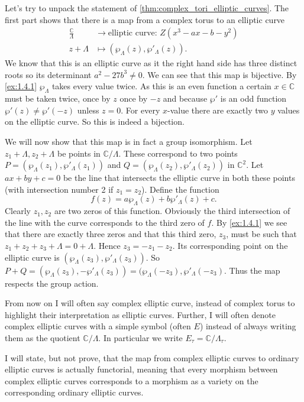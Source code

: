 \documentclass[titlepage,a4paper]{article}
\theoremstyle{theoremdd}
\theoremstyle{definitiondd}
\theoremstyle{remarkdd}
\newcommand{\C}{\mathbb{C}}
\begin{document}
Let's try to unpack the statement of \cref{thm:complex_tori_elliptic_curves}.
The first part shows that there is a map from a complex torus to an elliptic curve 
\begin{align*}
	\frac{\C}{\Lambda} &\longrightarrow \text{elliptic curve: } Z(x^3 - a x - b -y ^2) \\
	z+\Lambda &\longmapsto \left(\wp_\Lambda(z), \wp'_\Lambda(z)\right)
.\end{align*}
We know that this is an elliptic curve as it the right hand side has three distinct roots so its determinant $a^2 - 27 b^3 \ne 0  $.
We can see that this map is bijective. By \cref{ex:1.4.1}  $\wp_\Lambda$  takes every value twice. As this is an even function a certain $x \in \C$ must be taken twice, once by $z$ once by $-z$ and because $\wp'$ is an odd function $\wp'(z) \ne \wp'(-z)$ unless $z = 0$.  For every $x$-value there are exactly two $y$ values on the elliptic curve. So this is indeed a bijection. 

We will now show that this map is in fact a group isomorphism.
Let $z_1 + \Lambda, z_2 + \Lambda$ be points in $\C / \Lambda$.
These correspond to two points $P = (\wp_{\Lambda}(z_1), \wp'_\Lambda(z_1))$ and $ Q = (\wp_{\Lambda}(z_2), \wp'_\Lambda(z_2))$ in $\C^2$. 
Let $ax + by + c = 0$ be the line that intersects the elliptic curve in both these points (with intersection number 2 if  $z_1 = z_2$).
Define the function \[
	f(z) = a \wp_{\Lambda}(z) + b \wp'_\Lambda(z) + c
.\] 
Clearly $z_1, z_2$ are two zeros of this function. Obviously the third intersection of the line with the curve corresponds to the third zero of $f$. 
By \cref{ex:1.4.1} we see that there are exactly three zeros and that this third zero, $z_3$, must be such that $z_1 + z_2 + z_3 + \Lambda = 0 + \Lambda$. 
Hence $z_3 = - z_1 - z_2$. Its corresponding point on the elliptic curve is 
$(\wp_\Lambda(z_3), \wp'_\Lambda(z_3))$.
So $P + Q = (\wp_\Lambda(z_3), - \wp'_\Lambda(z_3)) = (\wp_\Lambda(-z_3), \wp'_\Lambda(-z_3)$. 
Thus the map respects the group action. 


From now on I will often say complex elliptic curve, instead of complex torus to highlight their interpretation as elliptic curves. Further, I will often denote complex elliptic curves with a simple symbol (often $E$) instead of always writing them as the quotient  $\C / \Lambda$. In particular we write $E_\tau  = \C / \Lambda_\tau$.

I will state, but not prove, that the map from complex elliptic curves to ordinary elliptic curves is actually functorial, meaning that every morphism between complex elliptic curves corresponds to a morphism as a variety on the corresponding ordinary elliptic curves.
\end{document}
